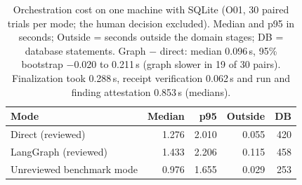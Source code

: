 \begin{table}[!htbp]
\caption{Orchestration cost on one machine with SQLite (O01, 30 paired
trials per mode; the human decision excluded). Median and p95 in seconds; Outside =
seconds outside the domain stages; DB = database statements. Graph $-$ direct: median
0.096\,s, 95\% bootstrap \ensuremath{-}0.020 to 0.211\,s
(graph slower in 19 of 30 pairs). Finalization took
0.288\,s, receipt verification 0.062\,s and run and
finding attestation 0.853\,s (medians).}
\label{tab:orch}
\centering
\small
\setlength{\tabcolsep}{4pt}
\begin{tabular}{@{}L{4.2cm}rrrr@{}}
\toprule
Mode & Median & p95 & Outside & DB \\
\midrule
Direct (reviewed) & 1.276 & 2.010 & 0.055 & 420 \\
LangGraph (reviewed) & 1.433 & 2.206 & 0.115 & 458 \\
Unreviewed benchmark mode & 0.976 & 1.655 & 0.029 & 253 \\
\bottomrule
\end{tabular}
\end{table}
